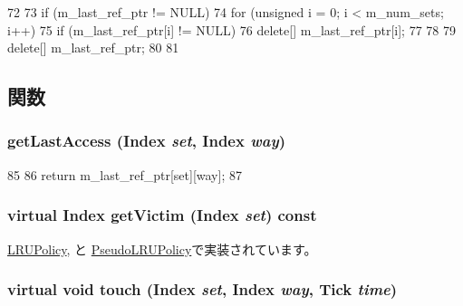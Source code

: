 \begin{DoxyCode}
72 {
73     if (m_last_ref_ptr != NULL){
74         for (unsigned i = 0; i < m_num_sets; i++){
75             if (m_last_ref_ptr[i] != NULL){
76                 delete[] m_last_ref_ptr[i];
77             }
78         }
79         delete[] m_last_ref_ptr;
80     }
81 }
\end{DoxyCode}


\subsection{関数}
\hypertarget{classAbstractReplacementPolicy_afbe88ba793f4549f1c7ef274372433e9}{
\subsubsection[{getLastAccess}]{ getLastAccess ({\bf Index} {\em set}, \/  {\bf Index} {\em way})}}
\label{classAbstractReplacementPolicy_afbe88ba793f4549f1c7ef274372433e9}



\begin{DoxyCode}
85 {
86     return m_last_ref_ptr[set][way];
87 }
\end{DoxyCode}
\hypertarget{classAbstractReplacementPolicy_a100bd69954d47ece014cbd697a1f8d7f}{
\subsubsection[{getVictim}]{\setlength{\rightskip}{0pt plus 5cm}virtual {\bf Index} getVictim ({\bf Index} {\em set}) const}}
\label{classAbstractReplacementPolicy_a100bd69954d47ece014cbd697a1f8d7f}


\hyperlink{classLRUPolicy_aad2c302009bdae8c2f86d7c4e0ed2c8f}{LRUPolicy}, と \hyperlink{classPseudoLRUPolicy_aad2c302009bdae8c2f86d7c4e0ed2c8f}{PseudoLRUPolicy}で実装されています。\hypertarget{classAbstractReplacementPolicy_a6354174153ace07b8cef20f36b20357a}{
\subsubsection[{touch}]{\setlength{\rightskip}{0pt plus 5cm}virtual void touch ({\bf Index} {\em set}, \/  {\bf Index} {\em way}, \/  {\bf Tick} {\em time})}}
\label{classAbstractReplacementPolicy_a6354174153ace07b8cef20f36b20357a}


